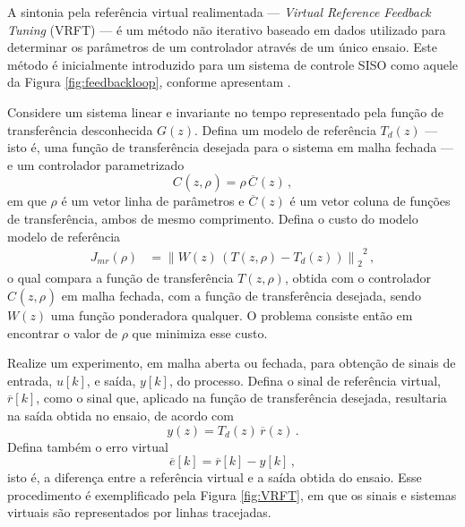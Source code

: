 \documentclass[repeatfields,oneside,overleaf]{tcc}
\newcommand{\mycdot}{ \, }
\newcommand{\myC}[2][]{ C_{#1} \left( #2 \right) }
\newcommand{\myoC}[2][]{ \overline{C_{#1}} \left( #2 \right) }
\newcommand{\myCzrho}[1]{ \myC[#1]{z, \rho_{#1}} }
\begin{document}
A sintonia pela referência virtual realimentada --- \textit{Virtual Reference Feedback Tuning} (VRFT) --- é um método não iterativo baseado em dados utilizado para determinar os parâmetros de um controlador através de um único ensaio.
Este método é inicialmente introduzido para um sistema de controle SISO como aquele da Figura \ref{fig:feedbackloop}, conforme apresentam \textcite{Campi2000}.

Considere um sistema linear e invariante no tempo representado pela função de transferência desconhecida $G(z)$.
Defina um modelo de referência $T_d(z)$ --- isto é, uma função de transferência desejada para o sistema em malha fechada --- e um controlador parametrizado
\begin{equation}\label{eq:VRFT_Czrho}
    \myCzrho{} = \rho \mycdot \myoC[]{z}
    \,,
\end{equation}
em que $\rho$ é um vetor linha de parâmetros e $\myoC[]{z}$ é um vetor coluna de funções de transferência, ambos de mesmo comprimento.
Defina o custo do modelo modelo de referência
\begin{equation}\label{eq:VRFT_Jmr}
\begin{aligned}
    J_{mr} \left( \rho \right)
    &= {\left\lVert W(z) \mycdot \left( T(z, \rho) - T_d(z) \right) \right\rVert_2}^2
    \,,
\end{aligned}
\end{equation}
o qual compara a função de transferência $T(z, \rho)$, obtida com o controlador $\myCzrho{}$ em malha fechada, com a função de transferência desejada, sendo $W(z)$ uma função ponderadora qualquer.
O problema consiste então em encontrar o valor de $\rho$ que minimiza esse custo.

Realize um experimento, em malha aberta ou fechada, para obtenção de sinais de entrada, $u[k]$, e saída, $y[k]$, do processo.
Defina o sinal de referência virtual, $\overline{r}[k]$, como o sinal que, aplicado na função de transferência desejada, resultaria na saída obtida no ensaio, de acordo com
\begin{equation}\label{eq:VRFT_rv}
    y(z) = T_d(z) \mycdot \overline{r}(z)
    \,.
\end{equation}
Defina também o erro virtual
\begin{equation}\label{eq:VRFT_ev}
    \overline{e}[k] = \overline{r}[k] - y[k]
    \,,
\end{equation}
isto é,  a diferença entre a referência virtual e a saída obtida do ensaio.
Esse procedimento é exemplificado pela Figura \ref{fig:VRFT}, em que os sinais e sistemas virtuais são representados por linhas tracejadas.
\end{document}
